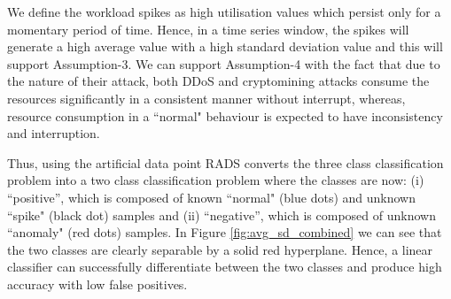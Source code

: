 We define the workload spikes as high utilisation values which persist only for a momentary period of time. Hence, in a time series window, the spikes will generate a high average value with a high standard deviation value and this will support Assumption-3.
We can support Assumption-4 with the fact that due to the nature of their attack, both DDoS and cryptomining attacks consume the resources significantly in a consistent manner without interrupt, whereas, resource consumption in a ``normal" behaviour is expected to have inconsistency and interruption. 

Thus, using the artificial data point RADS converts the three class classification problem into a two class classification problem where the classes are now: (i) ``positive'', which is composed of known ``normal" (blue dots) and unknown ``spike" (black dot) samples and (ii) ``negative'', which is composed of unknown ``anomaly" (red dots) samples. 
In Figure \ref{fig:avg_sd_combined} we can see that the two classes are clearly separable by a solid red hyperplane. Hence, a linear classifier can successfully differentiate between the two classes and produce high accuracy with low false positives. 


